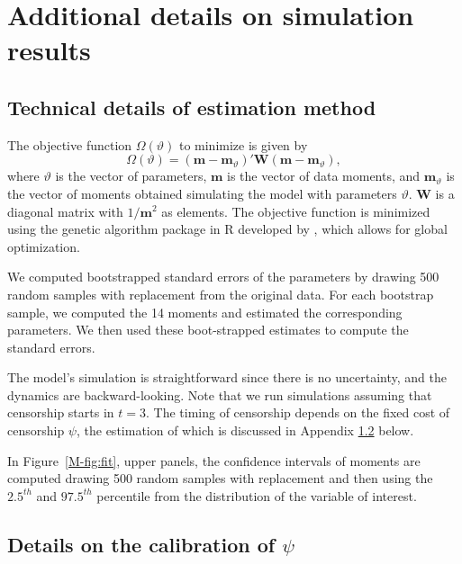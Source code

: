 \clearpage
\section{Additional details on simulation results}\label{app:simul}

\subsection{Technical details of estimation method} \label{app:dest}

The objective function $\Omega(\vartheta)$ to minimize is given by
\begin{equation}
\Omega(\vartheta)= (\mathbf{m}-\mathbf{m}_\vartheta)'\mathbf{W}(\mathbf{m}-\mathbf{m}_\vartheta),
\end{equation}
where $\vartheta$ is the vector of parameters, $\mathbf{m}$ is the vector of data moments, and  $\mathbf{m}_\vartheta$ is the vector of moments obtained simulating the model with parameters $\vartheta$. $\mathbf{W}$ is a diagonal matrix with $1/\mathbf{m}^2$ as elements. The objective function is minimized using the genetic algorithm package in R developed by , which allows for global optimization.

We computed bootstrapped standard errors of the parameters by drawing 500 random samples with replacement from the original data. For each bootstrap sample, we computed the 14 moments and estimated the corresponding parameters. We  then  used  these  boot-strapped estimates to compute the standard errors.

The model's simulation is straightforward since there is no uncertainty, and the  dynamics are backward-looking. Note that we run simulations assuming that censorship starts in $t=3$. The timing of censorship depends on the fixed cost of censorship $\psi$, the estimation of which is discussed in Appendix \ref{app:dpsi} below.

In Figure~\ref{M-fig:fit}, upper panels, the confidence intervals of moments are computed drawing 500 random samples with replacement and then using the $2.5^{th}$ and $97.5^{th}$ percentile from the distribution of the variable of interest.


\subsection{Details on the calibration of $\psi$} \label{app:dpsi}

